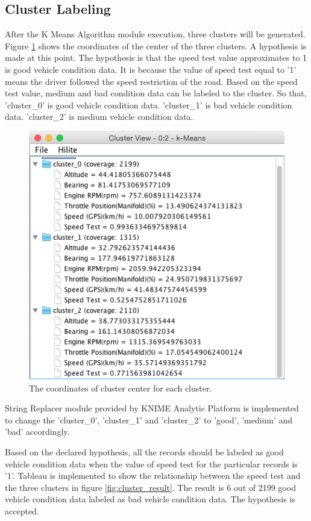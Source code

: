 \subsection{Cluster Labeling}
After the K Means Algorithm module execution, three clusters will be generated. Figure \ref{fig:cluster} shows the coordinates of the center of the three clusters. A hypothesis is made at this point. The hypothesis is that the speed test value approximates to 1 is good vehicle condition data. It is because the value of speed test equal to '1' means the driver followed the speed restriction of the road. Based on the speed test value, medium and bad condition data can be labeled to the cluster. So that, 'cluster\_0' is good vehicle condition data. 'cluster\_1' is bad vehicle condition data. 'cluster\_2' is medium vehicle condition data.

\begin{figure}[hbt!]\centering
\includegraphics[height=.5\textwidth]{image/cluster}
\caption{The coordinates of cluster center for each cluster.}
\label{fig:cluster}
\end{figure}


String Replacer module provided by KNIME Analytic Platform is implemented to change the 'cluster\_0', 'cluster\_1' and 'cluster\_2' to 'good', 'medium' and 'bad' accordingly.

Based on the declared hypothesis, all the records should be labeled as good vehicle condition data when the value of speed test for the particular records is '1'. Tableau is implemented to show the relationship between the speed test and the three clusters in figure \ref{fig:cluster_result}. The result is 6 out of 2199 good vehicle condition data labeled as bad vehicle condition data. The hypothesis is accepted.

